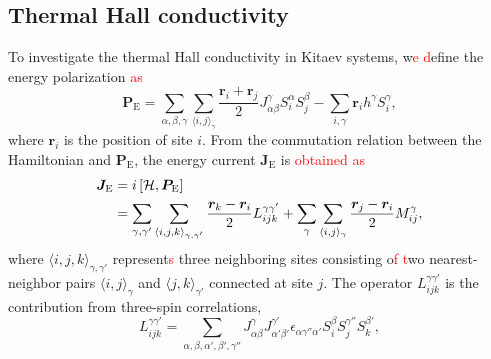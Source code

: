 \documentclass[twocolumn,superscriptaddress,showpacs, longbibliography, aps, prb]{revtex4-2}
\newcommand{\red}[1]{\textcolor{red}{#1}}
\newcommand{\blue}[1]{\textcolor{blue}{#1}}
\newcommand{\orange}[1]{\textcolor{orange}{#1}}
\begin{document}
\subsection{Thermal Hall conductivity}\label{subsec:Thermal Hall conductivity}
To investigate the thermal Hall conductivity in %
Kitaev systems, w\red{e %
d}efine 
the energy polarization %
\red{as}~\cite{Katsura2010,NasuYM2017}
\begin{equation}
 \bm{P}_{\mathrm{E}} = \sum_{\alpha,\beta,\gamma}\sum_{\langle i,j\rangle_\gamma} \frac{\bm{r}_i + \bm{r}_j}{2} J_{\alpha\beta}^\gamma S_i^\alpha S_j^\beta - \sum_{i,\gamma} \bm{r}_i h^\gamma S_i^\gamma,
\end{equation}
where $\bm{r}_i$ is the position of site $i$. 
From the commutation relation between the Hamiltonian and $\bm{P}_{\mathrm{E}}$,
the energy current $\bm{J}_{\mathrm{E}}$ is 
\red{obtained as} 
  \begin{align}
   \bm{J}_{\mathrm{E}} &=  i \left[\mathcal{H}, \bm{P}_{\mathrm{E}}\right] \notag \\
&= \sum_{\gamma,\gamma'}\sum_{\langle i,j,k\rangle_{\gamma,\gamma'}} \frac{\bm{r}_k-\bm{r}_i}{2}L_{ijk}^{\gamma\gamma'} + \sum_{\gamma}\sum_{\langle i,j\rangle_{\gamma}} \frac{\bm{r}_j-\bm{r}_i}{2}M_{ij}^{\gamma} 
   \label{eq:def_J},
  \end{align}
where $\langle i,j,k\rangle_{\gamma,\gamma'}$ represent\red{s} %
three neighboring sites consisting o\red{f %
t}wo nearest-neighbor pairs $\langle i,j\rangle_{\gamma}$ and $\langle j,k\rangle_{\gamma'}$ connected at site $j$.
The operator $L_{ijk}^{\gamma\gamma'}$ is the contribution from three-spin correlations,
\begin{equation}
 L_{ijk}^{\gamma\gamma'} = \sum_{\alpha,\beta,\alpha',\beta',\gamma''} J_{\alpha\beta}^\gamma J_{\alpha'\beta'}^{\gamma'} \epsilon_{\alpha\gamma''\alpha'} S_i^\beta S_j^{\gamma''}S_k^{\beta'},
 \label{eq:L}
\end{equation}
\end{document}

